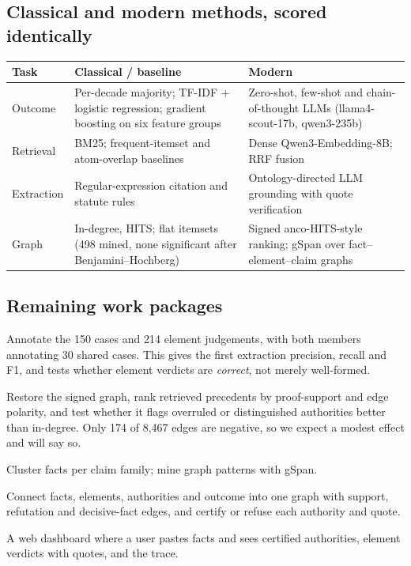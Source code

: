 \documentclass[12pt,a4paper]{article}
\newcommand{\hdr}{\rowcolor{band}}
\begin{document}
\subsection{Classical and modern methods, scored identically}
\begin{tabularx}{\textwidth}{@{}P{2.1cm}Y Y@{}}
\toprule
\hdr \textbf{Task} & \textbf{Classical / baseline} & \textbf{Modern} \\
\midrule
Outcome & Per-decade majority; TF-IDF + logistic regression; gradient boosting on six feature groups & Zero-shot, few-shot and chain-of-thought LLMs (llama4-scout-17b, qwen3-235b) \\
Retrieval & BM25; frequent-itemset and atom-overlap baselines & Dense Qwen3-Embedding-8B; RRF fusion \\
Extraction & Regular-expression citation and statute rules & Ontology-directed LLM grounding with quote verification \\
Graph & In-degree, HITS; flat itemsets (498 mined, none significant after Benjamini--Hochberg) & Signed anco-HITS-style ranking; gSpan over fact--element--claim graphs \\
\bottomrule
\end{tabularx}

\subsection{Remaining work packages}
\begin{description}[leftmargin=0pt,labelindent=0pt,style=unboxed,itemsep=2pt]
\item[WP1 Gold evaluation.] Annotate the 150 cases and 214 element judgements, with both members
annotating 30 shared cases. This gives the first extraction precision, recall and F1, and tests whether
element verdicts are \emph{correct}, not merely well-formed.
\item[WP2 Signed authority ranking.] Restore the signed graph, rank retrieved precedents by
proof-support and edge polarity, and test whether it flags overruled or distinguished authorities
better than in-degree. Only 174 of 8,467 edges are negative, so we expect a modest effect and will say so.
\item[WP3 Claim-family patterns.] Cluster facts per claim family; mine graph patterns with gSpan.
\item[WP4 Proof graph and verifier.] Connect facts, elements, authorities and outcome into one graph with
support, refutation and decisive-fact edges, and certify or refuse each authority and quote.
\item[WP5 Demo.] A web dashboard where a user pastes facts and sees certified authorities, element
verdicts with quotes, and the trace.
\end{description}
\end{document}
